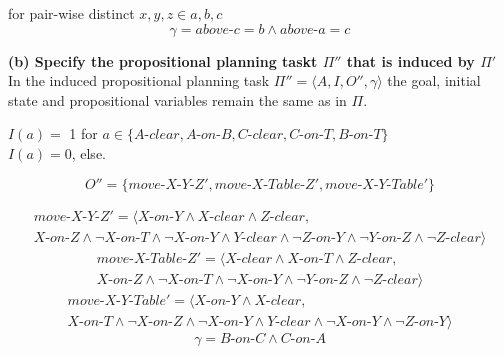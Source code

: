 \documentclass[12pt,a4paper]{article}
\begin{document}
for pair-wise distinct $x,y,z \in {a, b, c}$
\[\gamma = above\text{-}c = b \land above\text{-}a = c\]

\textbf{(b) Specify the propositional planning taskt $\Pi''$ that is 
induced by $\Pi'$}\\

In the induced propositional planning task 
$\Pi'' = \langle A, I, O'', \gamma \rangle$
the goal, initial state and propositional variables 
remain the same as in $\Pi.$

\begin{center}
$ I(a) = $ 1 for $ a \in \{ A$-$clear, A$-$on$-$B,
	C$-$clear,C$-$on$-$T, B$-$on$-$T \} $\\
$I(a)= 0$, else.
\end{center}
	\[O'' = \{move\text{-}X\text{-}Y\text{-}Z' , 
			move\text{-}X\text{-}Table\text{-}Z', 
			move\text{-}X\text{-}Y\text{-}Table'\}\]
	
	\begin{multline*}
		move\text{-}X\text{-}Y\text{-}Z '=
		\langle 
			X\text{-}on\text{-}Y \land
			X\text{-}clear \land
			Z\text{-}clear,\\
			X\text{-}on\text{-}Z \land
			\neg X\text{-}on\text{-}T \land
			\neg X\text{-}on\text{-}Y \land
			Y\text{-}clear \land
			\neg Z\text{-}on\text{-}Y \land
			\neg Y\text{-}on\text{-}Z \land
			\neg Z\text{-}clear
		\rangle 
	\end{multline*}
	\begin{multline*}
		move\text{-}X\text{-}Table\text{-}Z '=\langle 
		X\text{-}clear \land
		X\text{-}on\text{-} T \land
		Z\text{-}clear,\\
		X\text{-}on\text{-}Z \land
		\neg X\text{-}on\text{-}T \land
		\neg X\text{-}on\text{-}Y \land
		\neg Y\text{-}on\text{-}Z \land
		\neg Z\text{-}clear
		\rangle 
	\end{multline*}
	\begin{multline*}
		move\text{-}X\text{-}Y\text{-}Table' =\langle 
		X\text{-}on\text{-} Y \land
		X\text{-}clear,\\
		X\text{-}on\text{-}T \land
		\neg X\text{-}on\text{-}Z \land
		\neg X\text{-}on\text{-}Y \land
		Y\text{-}clear \land
		\neg X\text{-}on\text{-}Y \land
		\neg Z\text{-}on\text{-}Y
		\rangle 
	\end{multline*}
	\[\gamma = B\text{-}on\text{-}C \land C\text{-}on\text{-}A\]
\end{document}
